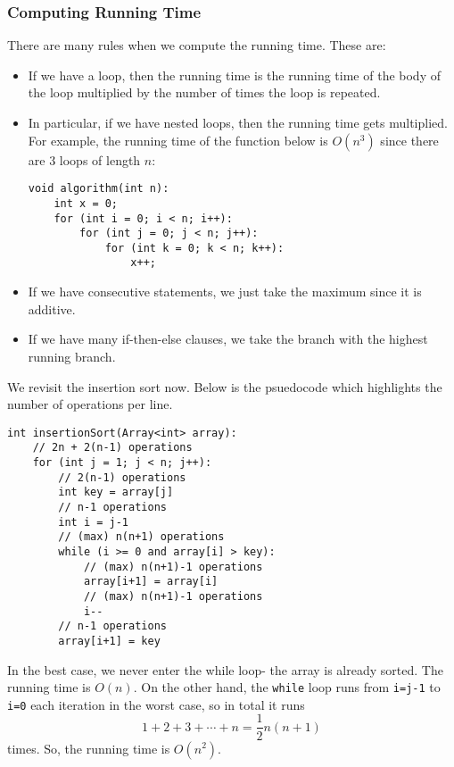 \documentclass[a4paper, openany]{memoir}
\begin{document}
\subsubsection{Computing Running Time}
There are many rules when we compute the running time. These are:
\begin{itemize}
    \item If we have a loop, then the running time is the running time of the body of the loop multiplied by the number of times the loop is repeated.
    \item In particular, if we have nested loops, then the running time gets multiplied. For example, the running time of the function below is $O(n^3)$ since there are $3$ loops of length $n$:
\begin{lstlisting}[language=pseudocode]
void algorithm(int n):
    int x = 0;
    for (int i = 0; i < n; i++):
        for (int j = 0; j < n; j++):
            for (int k = 0; k < n; k++):
                x++;
\end{lstlisting}
    \item If we have consecutive statements, we just take the maximum since it is additive.
    \item If we have many if-then-else clauses, we take the branch with the highest running branch.
\end{itemize}
We revisit the insertion sort now. Below is the psuedocode which highlights the number of operations per line.
\begin{lstlisting}[language=pseudocode]
int insertionSort(Array<int> array):
    // 2n + 2(n-1) operations
    for (int j = 1; j < n; j++):
        // 2(n-1) operations
        int key = array[j]
        // n-1 operations
        int i = j-1
        // (max) n(n+1) operations
        while (i >= 0 and array[i] > key):
            // (max) n(n+1)-1 operations
            array[i+1] = array[i]
            // (max) n(n+1)-1 operations
            i--
        // n-1 operations
        array[i+1] = key
\end{lstlisting}
In the best case, we never enter the while loop- the array is already sorted. The running time is $O(n)$. On the other hand, the \texttt{while} loop runs from \texttt{i=j-1} to \texttt{i=0} each iteration in the worst case, so in total it runs 
\[1 + 2 + 3 + \cdots + n = \frac{1}{2} n(n+1)\]
times. So, the running time is $O(n^2)$.
\end{document}
